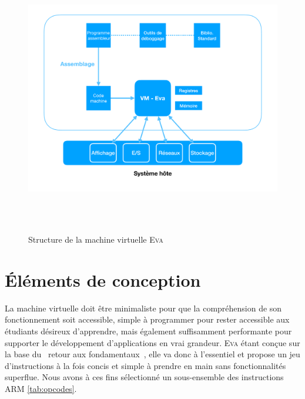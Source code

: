 \documentclass[11pt,twoside,french]{article}
\makeatletter
\providecommand{\og}{\leavevmode\flqq~}%
\providecommand{\fg}{\ifdim\lastskip>\z@\unskip\fi~\frqq}%
\newcommand{\noun}[1]{\textsc{#1}}
\newcommand{\noun}[1]{\textsc{#1}}
\makeatother
\begin{document}
\begin{figure}[p]
  \centering
  \includegraphics[width=12cm, height=12cm, keepaspectratio]{diagram1_graph.pdf}
  \caption{Structure de la machine virtuelle \noun{Eva}}
  \label{fig:diagram1}
\end{figure}


\section{Éléments de conception}

La machine virtuelle doit être minimaliste pour que la compréhension de son fonctionnement soit accessible, simple à programmer pour rester accessible aux étudiants désireux d'apprendre, mais également suffisamment performante pour supporter le développement d'applications en vrai grandeur. \noun{Eva} étant conçue sur la base du \og retour aux fondamentaux\fg , elle va donc à l'essentiel et propose un jeu d'instructions à la fois concis et simple à prendre en main sans fonctionnalités superflue. Nous avons à ces fins sélectionné un sous-ensemble des instructions ARM \ref{tab:opcodes}.
\end{document}
